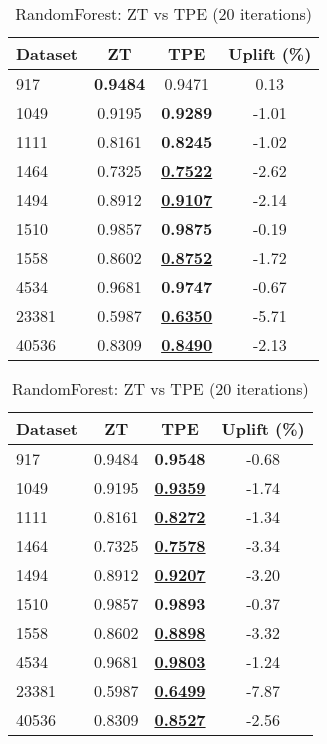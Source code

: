 \begin{table}[htbp]
\begin{center}
\begin{small}
\begin{sc}
\begin{subtable}[t]{0.48\textwidth}
    \centering
    \caption{RandomForest: ZT vs TPE (10 iterations)}
    \label{tab:randomforest-zt-vs-tpe-10}
    \begin{tabular}{lccc}
    \toprule
    \textbf{Dataset} & \textbf{ZT} & \textbf{TPE} & \textbf{Uplift (\%)} \\
    \midrule
    917    & \textbf{0.9484} & 0.9471 & 0.13 \\
    1049    & 0.9195 & \textbf{0.9289} & -1.01 \\
    1111    & 0.8161 & \textbf{0.8245} & -1.02 \\
    1464    & 0.7325 & \underline{\textbf{0.7522}} & -2.62 \\
    1494    & 0.8912 & \underline{\textbf{0.9107}} & -2.14 \\
    1510    & 0.9857 & \textbf{0.9875} & -0.19 \\
    1558    & 0.8602 & \underline{\textbf{0.8752}} & -1.72 \\
    4534    & 0.9681 & \textbf{0.9747} & -0.67 \\
    23381    & 0.5987 & \underline{\textbf{0.6350}} & -5.71 \\
    40536    & 0.8309 & \underline{\textbf{0.8490}} & -2.13 \\
    \bottomrule
    \end{tabular}
\end{subtable}
\hfill
\begin{subtable}[t]{0.48\textwidth}
    \centering
    \caption{RandomForest: ZT vs TPE (20 iterations)}
    \label{tab:randomforest-zt-vs-tpe-20}
    \begin{tabular}{lccc}
    \toprule
    \textbf{Dataset} & \textbf{ZT} & \textbf{TPE} & \textbf{Uplift (\%)} \\
    \midrule
    917    & 0.9484 & \textbf{0.9548} & -0.68 \\
    1049    & 0.9195 & \underline{\textbf{0.9359}} & -1.74 \\
    1111    & 0.8161 & \underline{\textbf{0.8272}} & -1.34 \\
    1464    & 0.7325 & \underline{\textbf{0.7578}} & -3.34 \\
    1494    & 0.8912 & \underline{\textbf{0.9207}} & -3.20 \\
    1510    & 0.9857 & \textbf{0.9893} & -0.37 \\
    1558    & 0.8602 & \underline{\textbf{0.8898}} & -3.32 \\
    4534    & 0.9681 & \underline{\textbf{0.9803}} & -1.24 \\
    23381    & 0.5987 & \underline{\textbf{0.6499}} & -7.87 \\
    40536    & 0.8309 & \underline{\textbf{0.8527}} & -2.56 \\
    \bottomrule
    \end{tabular}
\end{subtable}


\end{sc}
\end{small}
\end{center}
\end{table}
